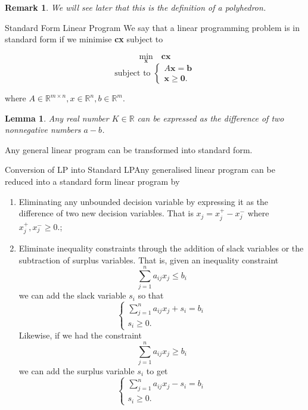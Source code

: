 \documentclass[twoside]{article}
\newtheorem{lemma}[theorem]{Lemma}
\newtheorem{remark}[theorem]{Remark}
\begin{document}
\begin{remark}We will see later that this is the definition of a polyhedron.
\end{remark}

\begin{definition_exam}{Standard Form Linear Program}{} We say that a linear programming problem is in standard form if we minimise \textbf{c}\textbf{x} subject to 

$$
\min_{\textbf{x}} \quad \textbf{c}\textbf{x}
$$
$$
\text{subject to }
\begin{cases}
A\textbf{x} = \textbf{b}\\
\textbf{x} \geq \textbf{0}.
\end{cases}
$$

where $A \in \mathbb{R}^{m \times n}, x \in \mathbb{R}^n, b \in \mathbb{R}^m$. 
\end{definition_exam}


\begin{lemma}Any real number $K \in \mathbb{R}$ can be expressed as the difference of two nonnegative numbers $a - b$.
\end{lemma}

Any general linear program can be transformed into standard form.

\begin{theorem_exam}{Conversion of LP into Standard LP}{}Any generalised linear program can be reduced into a standard form linear program by 
\begin{enumerate}
    \item Eliminating any unbounded decision variable by expressing it as  the difference of two new decision variables. That is $x_j = x_j^+ - x_j^-$ where $x_j^+, x_j^- \geq 0.$;
    \item Eliminate inequality constraints through the addition of slack variables or the subtraction of surplus variables. That is, given an inequality constraint 
    $$
    \sum_{j=1}^{n}a_{ij}x_j \leq b_i
    $$
    we can add the slack variable $s_i$ so that 
    $$
    \begin{cases}
    \sum_{j=1}^{n}a_{ij}x_j + s_i = b_i\\
    s_i \geq 0.
    \end{cases}
    $$
    Likewise, if we had the constraint 
    $$
    \sum_{j=1}^{n}a_{ij}x_j \geq b_i
    $$
    we can add the surplus variable $s_i$ to get 
    $$
    \begin{cases}
    \sum_{j=1}^{n}a_{ij}x_j  - s_i = b_i\\
    s_i \geq 0.
    \end{cases}
    $$
\end{enumerate}
\end{theorem_exam}
\end{document}
